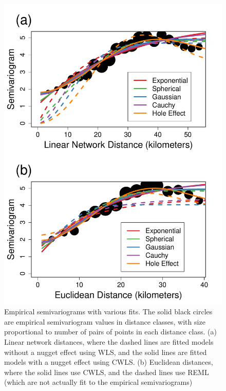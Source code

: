 \documentclass[11pt, titlepage]{article}\usepackage[]{graphicx}\usepackage[]{color}
\begin{document}
\begin{spacing}{1.9}
\begin{flushleft}
\begin{singlespace}
	\begin{figure}[H]
	  \begin{center}
	    \includegraphics[width=.8\linewidth]{figure/Fig-empSemivar-1.pdf}
	  \end{center}
	  \caption{Empirical semivariograms with various fits. The solid black circles are empirical semivariogram values in distance classes, with size proportional to number of pairs of points in each distance class. (a) Linear network distances, where the dashed lines are fitted models without a nugget effect using WLS, and the solid lines are fitted models with a nugget effect using CWLS. (b) Euclidean distances, where the solid lines use CWLS, and the dashed lines use REML (which are not actually fit to the empirical semivariograms) \label{fig:empsvgm}}
  \end{figure}




\end{singlespace}
\end{flushleft}
\end{spacing}
\end{document}
